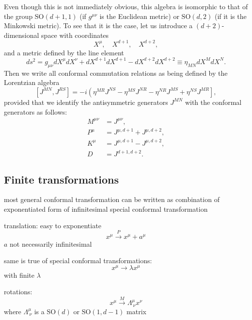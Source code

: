 \documentclass[a4paper,12pt]{article}
\numberwithin{equation}{section}
\begin{document}
Even though this is not immediately obvious, this algebra is isomorphic to that of the group $\text{SO}(d+1, 1)$ (if $g^{\mu\nu}$ is the Euclidean metric) or $\text{SO}(d, 2)$ (if it is the Minkowski metric).
To see that it is the case, let us introduce a $(d + 2)$-dimensional space with coordinates
\begin{equation}
	X^\mu, \quad X^{d+1}, \quad X^{d+2},
\end{equation}
and a metric defined by the line element
\begin{equation}
	ds^2 = g_{\mu\nu} dX^\mu dX^\nu + dX^{d+1} dX^{d+1}
	- dX^{d+2} dX^{d+2}
	\equiv \eta_{MN} dX^M dX^N.
\end{equation}
Then we write all conformal commutation relations as being defined by the Lorentzian algebra
\begin{equation}
	\left[ J^{MN}, J^{RS} \right]
	= -i \left( \eta^{MR} J^{NS} - \eta^{MS} J^{NR}
	- \eta^{NR} J^{MS} + \eta^{NS} J^{MR} \right],
\end{equation}
provided that we identify the antisymmetric generators $J^{MN}$ with the conformal generators as follows:
\begin{equation}
\begin{aligned}
	M^{\mu\nu} &= J^{\mu\nu},
	\\
	P^\mu &= J^{\mu, d+1} + J^{\mu, d+2},
	\\
	K^\mu &= J^{\mu, d+1} - J^{\mu, d+2},
	\\
	D &= J^{d+1, d+2}.
\end{aligned}
\end{equation}


\subsection{Finite transformations}

most general conformal transformation can be written as combination of exponentiated form of infinitesimal special conformal transformation

translation: easy to exponentiate
\begin{equation}
	x^\mu \xrightarrow{P} x^\mu + a^\mu
\end{equation}
$a$ not necessarily infinitesimal

same is true of special conformal transformations:
\begin{equation}
	x^\mu \to \lambda x^\mu
\end{equation}
with finite $\lambda$

rotations:
\begin{equation}
	x^\mu \xrightarrow{M} \Lambda^\mu_{~\nu} x^\nu
\end{equation}
where $\Lambda^\mu_{~\nu}$ is a $\text{SO}(d)$ or $\text{SO}(1, d-1)$ matrix
\end{document}
